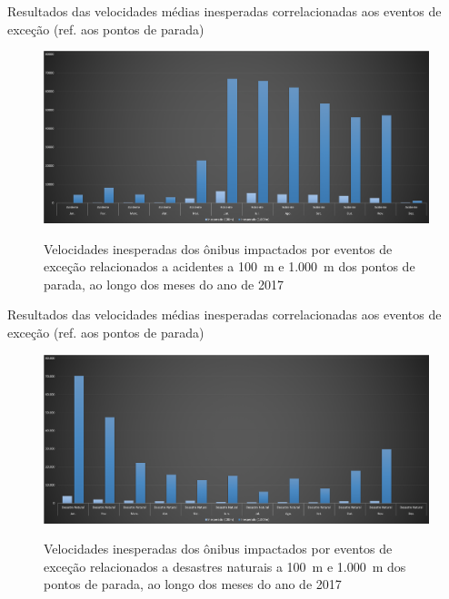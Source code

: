 \documentclass{beamer}
\begin{document}
\begin{frame}{Resultados das velocidades médias inesperadas correlacionadas aos eventos de exceção (ref. aos pontos de parada)}
\begin{figure}[!htb]
	\centering
 	  \caption{Velocidades inesperadas dos ônibus impactados por eventos de exceção relacionados a acidentes a 100~m e 1.000~m dos pontos de parada, ao longo dos meses do ano de 2017}
		\includegraphics[width=0.8\linewidth]{apriori_analysis_stops_accidents.png}
	\label{fig:apriori_analysis_stops_accidents}
\end{figure}
\end{frame}
\begin{frame}{Resultados das velocidades médias inesperadas correlacionadas aos eventos de exceção (ref. aos pontos de parada)}
\begin{figure}[!htb]
	\centering
 	  \caption{Velocidades inesperadas dos ônibus impactados por eventos de exceção relacionados a desastres naturais a 100~m e 1.000~m dos pontos de parada, ao longo dos meses do ano de 2017}
		\includegraphics[width=0.8\linewidth]{apriori_analysis_stops_natural_disasters.png}
	\label{fig:apriori_analysis_stops_natural_disasters}
\end{figure}
\end{frame}
\end{document}
